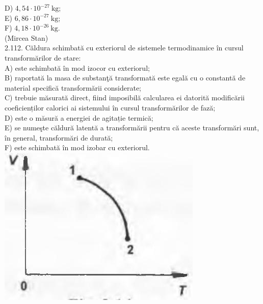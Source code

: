 \documentclass[10pt]{article}
\begin{document}
D) $4,54 \cdot 10^{-27} \mathrm{~kg}$;\\
E) $6,86 \cdot 10^{-27} \mathrm{~kg}$;\\
F) $4,18 \cdot 10^{-26} \mathrm{~kg}$.\\
(Mircea Stan)\\
2.112. Căldura schimbată cu exteriorul de sistemele termodinamice în cursul transformărilor de stare:\\
A) este schimbată în mod izocor cu exteriorul;\\
B) raportată la masa de substanţă transformată este egală cu o constantă de material specifică transformării considerate;\\
C) trebuie măsurată direct, fiind imposibilă calcularea ei datorită modificării coeficienților calorici ai sistemului în cursul transformărilor de fază;\\
D) este o măsură a energiei de agitație termică;\\
E) se numeşte căldură latentă a transformării pentru că aceste transformări sunt, în general, transformări de durată;\\
F) este schimbată în mod izobar cu exteriorul.\\
\includegraphics[max width=\textwidth, center]{2025_07_01_5b3ff9fa0d508c8e9f17g-098}
\end{document}
